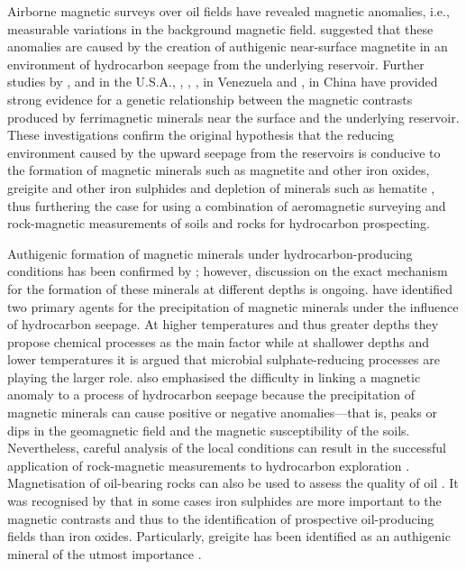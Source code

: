Airborne magnetic surveys over oil fields \citep{Donovan1979} have revealed magnetic anomalies, i.e., measurable variations in the background magnetic field. \citet{Donovan1979} suggested that these anomalies are caused by the creation of authigenic near-surface magnetite in an environment of hydrocarbon seepage from the underlying reservoir. Further studies by \citet{Donovan1984}, \citet{Elmore1993} and \citet{Reynolds1993} in the U.S.A., \citet{Diaz2000}, \citet{Costanzo2006,Costanzo2012}, \citet{Gonzalez2002}, \citet{Guzman2011} in Venezuela and \citet{Liu1999}, \citet{Liu2004,Liu2006} in China have provided strong evidence for a genetic relationship between the magnetic contrasts produced by ferrimagnetic minerals near the surface and the underlying reservoir. These investigations confirm the original hypothesis \citep{Donovan1979} that the reducing environment caused by the upward seepage from the reservoirs is conducive to the formation of magnetic minerals such as magnetite and other iron oxides, greigite and other iron sulphides and depletion of minerals such as hematite \citep{Machel1991}, thus furthering the case for using a combination of aeromagnetic surveying and rock-magnetic measurements of soils and rocks for hydrocarbon prospecting.\par

Authigenic formation of magnetic minerals under hydrocarbon-producing conditions has been confirmed by \citet{Abubakar2015}; however, discussion on the exact mechanism for the formation of these minerals at different depths is ongoing. \citet{Machel1991} have identified two primary agents for the precipitation of magnetic minerals under the influence of hydrocarbon seepage. At higher temperatures and thus greater depths they propose chemical processes as the main factor while at shallower depths and lower temperatures it is argued that microbial sulphate-reducing processes are playing the larger role. \citet{Machel1991} also emphasised the difficulty in linking a magnetic anomaly to a process of hydrocarbon seepage because the precipitation of magnetic minerals can cause positive or negative anomalies---that is, peaks or dips in the geomagnetic field and the magnetic susceptibility of the soils. Nevertheless, careful analysis of the local conditions can result in the successful application of rock-magnetic measurements to hydrocarbon exploration \citep{Donovan1984,Liu2006,Emmerton2013B}. Magnetisation of oil-bearing rocks can also be used to assess the quality of oil \citep{Emmerton2013}. It was recognised by \citet{Reynolds1993} that in some cases iron sulphides are more important to the magnetic contrasts and thus to the identification of prospective oil-producing fields than iron oxides. Particularly, greigite has been identified as an authigenic mineral of the utmost importance \citep{Reynolds1993}.\par

